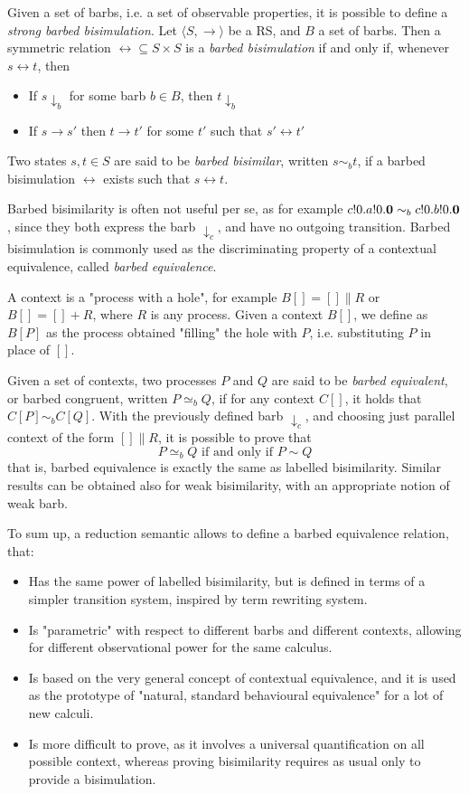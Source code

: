Given a set of barbs, i.e. a set of observable properties, it is possible to define a \textit{strong barbed bisimulation}.
Let $\langle S , \rightarrow \rangle$ be a RS, and $B$ a set of barbs. Then a symmetric relation $\rel \subseteq S \times S$ is a \textit{barbed bisimulation} if and only if, whenever $s \rel t$, then 
\begin{itemize}
\item If $s \downarrow_b$ for some barb $b \in B$, then $t \downarrow_b$
\item If $s \rightarrow s'$ then $t \rightarrow t'$ for some $t'$ such that $s' \rel t'$
\end{itemize}
Two states $s, t \in S$ are said to be \textit{barbed bisimilar}, written $s \sim_b t$, if a barbed bisimulation $\rel$ exists such that $s \rel t$.

Barbed bisimilarity is often not useful per se, as for example $c!0.a!0.\mathbf{0} \sim_b c!0.b!0.\mathbf{0}$, since they both express the barb $\downarrow_c$, and have no outgoing transition. Barbed bisimulation is commonly used as the discriminating property of a contextual equivalence, called \textit{barbed equivalence}.

A context is a "process with a hole", for example $B[] = [] \parallel R$ or $B[] = [] + R$, where $R$ is any process. Given a context $B[]$, we define as $B[P]$ as the process obtained "filling" the hole with $P$, i.e. substituting $P$ in place of $[]$.

Given a set of contexts, two processes $P$ and $Q$ are said to be \textit{barbed equivalent}, or barbed congruent, written $P \simeq_b Q$, if for any context $C[]$, it holds that $C[P] \sim_b C[Q]$. With the previously defined barb $\downarrow_c$, and choosing just parallel context of the form $[] \parallel R$, it is possible to prove that
\[P \simeq_b Q \text{ if and only if } P \sim Q\]
that is, barbed equivalence is exactly the same as labelled bisimilarity. Similar results can be obtained also for weak bisimilarity, with an appropriate notion of weak barb.

To sum up, a reduction semantic allows to define a barbed equivalence relation, that: \begin{itemize}
\item Has the same power of labelled bisimilarity, but is defined in terms of a simpler transition system, inspired by term rewriting system.
\item Is "parametric" with respect to different barbs and different contexts, allowing for different observational power for the same calculus.
\item Is based on the very general concept of contextual equivalence, and it is used as the prototype of "natural, standard behavioural equivalence" for a lot of new calculi.
\item Is more difficult to prove, as it involves a universal quantification on all possible context, whereas proving bisimilarity requires as usual only to provide a bisimulation.
\end{itemize}